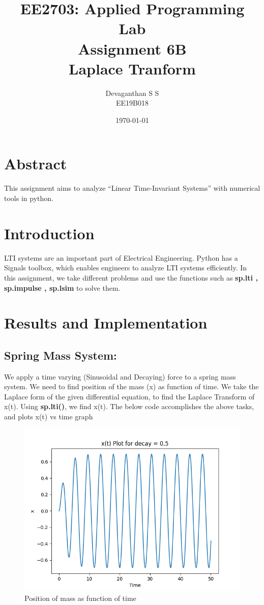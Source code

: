 \documentclass[12pt, a4paper]{report}
\title{\textbf{EE2703: Applied Programming Lab\\Assignment 6B\\Laplace Tranform
}}
\author{Devaganthan S S\\ EE19B018}
\date{\today}
\begin{document}
\maketitle


\section{Abstract}
This assignment aims to analyze “Linear Time-Invariant Systems” with numerical tools in python.

\section{Introduction}
LTI systems are an important part of Electrical Engineering. Python has a Signals toolbox, which enables engineers to analyze LTI systems efficiently. In this assignment, we take different problems and use the functions such as \textbf{sp.lti , sp.impulse , sp.lsim } to solve them.
\section{Results and Implementation}
\subsection{Spring Mass System:}
We apply a time varying (Sinusoidal and Decaying) force to a spring mass system. We need to find position of the mass (x) as function of time. We take the Laplace form of the given differential equation, to find the Laplace Transform of x(t). Using \textbf{sp.lti()}, we find x(t). The below code accomplishes the above tasks, and plots x(t) vs time graph
\noindent

\begin{figure}[h!]
    \centering
    \includegraphics[scale=0.75]{fig1.png} 
    \caption{Position of mass as function of time}
    \label{fig:my_label}
\end{figure}
\vspace{100mm}
\end{document}
